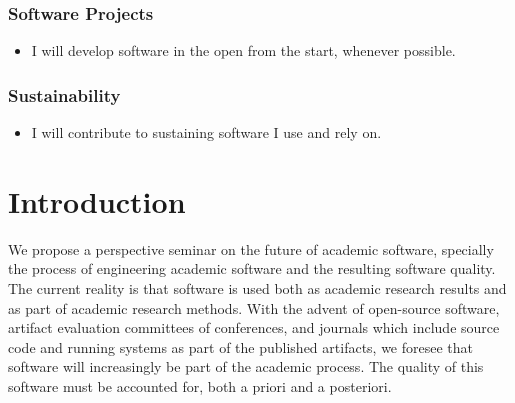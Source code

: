 \documentclass[a4paper,UKenglish]{dagman}
\renewcommand{\paragraph}[1]{\subsubsection*{#1}\xspace}
\begin{document}
\paragraph{Software Projects}
\begin{itemize}
\item I will develop software in the open from the start, whenever possible.
\end{itemize}

\paragraph{Sustainability}
\begin{itemize}
\item I will contribute to sustaining software I use and rely on. 
\end{itemize}



\tableofcontents

\section{Introduction}


We propose a perspective seminar on the future of academic software, specially the process of engineering academic software and the resulting software quality. The current reality is that software is used both as academic research results and as part of academic research methods. With the advent of open-source software, artifact evaluation committees of conferences, and journals which include source code and running systems as part of the published artifacts, we foresee that software will increasingly be part of the academic process. The quality of this software must be accounted for, both a priori and a posteriori.
\end{document}

